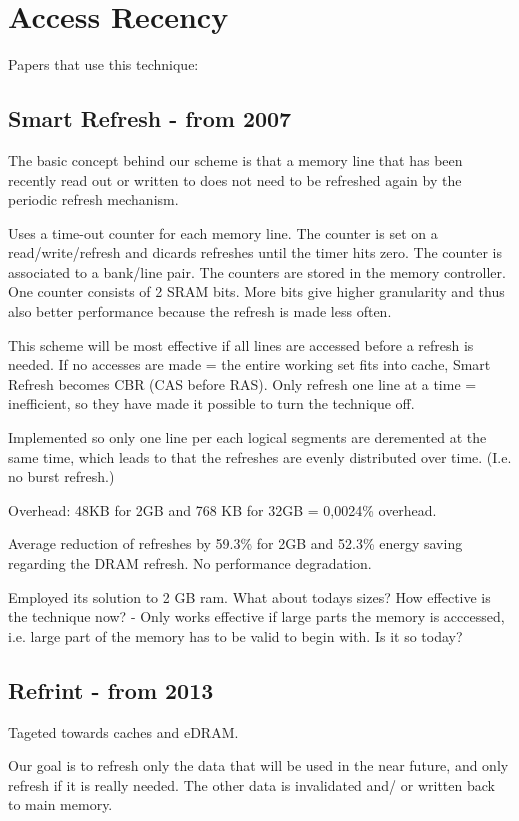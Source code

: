 \section{Access Recency}
\label{sec:acc}

Papers that use this technique:

\subsection{Smart Refresh\cite{smartrefresh} - from 2007}
The basic concept behind our scheme is that a memory line that has been recently read out or written to does not need to be refreshed again by the periodic refresh mechanism.

Uses a time-out counter for each memory line. The counter is set on a read/write/refresh and dicards refreshes until the timer hits zero. The counter is associated to a bank/line pair. The counters are stored in the memory controller. One counter consists of 2 SRAM bits. More bits give higher granularity and thus also better performance because the refresh is made less often.

This scheme will be most effective if all lines are accessed before a refresh is needed. If no accesses are made = the entire working set fits into cache, Smart Refresh becomes CBR (CAS before RAS). Only refresh one line at a time = inefficient, so they have made it possible to turn the technique off.

Implemented so only one line per each logical segments are deremented at the same time, which leads to that the refreshes are evenly distributed over time. (I.e. no burst refresh.)

Overhead: 48KB for 2GB and 768 KB for 32GB = 0,0024\% overhead. 

Average reduction of refreshes by 59.3\% for 2GB and 52.3\% energy saving regarding the DRAM refresh. No performance degradation.

Employed its solution to 2 GB ram. What about todays sizes? How effective is the technique now? - Only works effective if large parts the memory is acccessed, i.e. large part of the memory has to be valid to begin with. Is it so today?

\subsection{Refrint\cite{refrint} - from 2013}
Tageted towards caches and eDRAM.

Our goal is to refresh only the data that will be used in the near future, and only refresh if it is really needed. The other data is invalidated and/ or written back to main memory.

